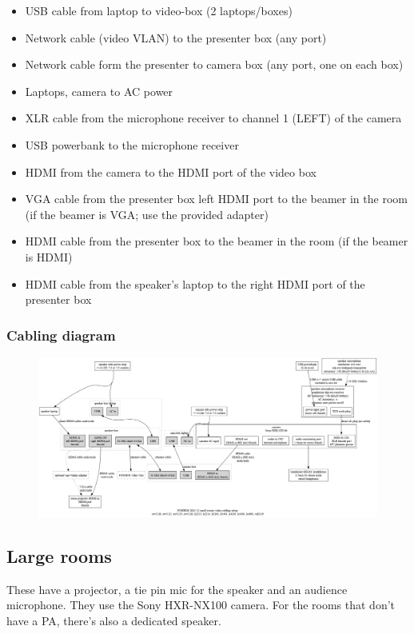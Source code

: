 \documentclass{article}
\begin{document}
\begin{itemize}
  \item USB cable from laptop to video-box (2 laptops/boxes)
  \item Network cable (video VLAN) to the presenter box (any port)
  \item Network cable form the presenter to camera box (any port, one on each box)
  \item Laptops, camera to AC power
  \item XLR cable from the microphone receiver to channel 1 (LEFT) of the camera
  \item USB powerbank to the microphone receiver
  \item HDMI from the camera to the HDMI port of the video box
  \item VGA cable from the presenter box left HDMI port to the beamer in the room (if the beamer is VGA; use the provided adapter)
  \item HDMI cable from the presenter box to the beamer in the room (if the beamer is HDMI)
  \item HDMI cable from the speaker's laptop to the right HDMI port of the presenter box
\end{itemize}
\subsubsection{Cabling diagram}
\begin{figure}[H]
  \begin{sideways}
  \centering
  \includegraphics[width = 200mm]{../../graph/cabling_small_rooms.png}
  \end{sideways}
\end{figure}

\subsection{Large rooms}
These have a projector, a tie pin mic for the speaker and an audience microphone. They use the Sony HXR-NX100 camera. For the rooms that don't have a PA, there's also a dedicated speaker.
\end{document}
